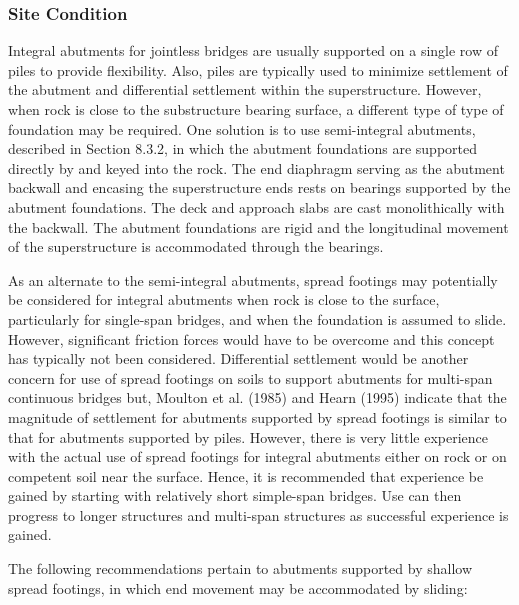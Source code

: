 \subsubsection{Site Condition}
Integral abutments for jointless bridges are usually supported on a single row of piles to provide flexibility. Also,
piles are typically used to minimize settlement of the abutment and differential settlement within the superstructure.
However, when rock is close to the substructure bearing surface, a different type of type of foundation may be
required. One solution is to use semi-integral abutments, described in Section 8.3.2, in which the abutment
foundations are supported directly by and keyed into the rock. The end diaphragm serving as the abutment backwall
and encasing the superstructure ends rests on bearings supported by the abutment foundations. The deck and approach
slabs are cast monolithically with the backwall. The abutment foundations are rigid and the longitudinal movement of
the superstructure is accommodated through the bearings.

As an alternate to the semi-integral abutments, spread footings may potentially be considered for integral
abutments when rock is close to the surface, particularly for single-span bridges, and when the foundation is assumed
to slide. However, significant friction forces would have to be overcome and this concept has typically not been
considered. Differential settlement would be another concern for use of spread footings on soils to support abutments
for multi-span continuous bridges but, Moulton et al. (1985) and Hearn (1995) indicate that the magnitude of
settlement for abutments supported by spread footings is similar to that for abutments supported by piles. However,
there is very little experience with the actual use of spread footings for integral abutments either on rock or on
competent soil near the surface. Hence, it is recommended that experience be gained by starting with relatively short
simple-span bridges. Use can then progress to longer structures and multi-span structures as successful experience is
gained.

The following recommendations pertain to abutments supported by shallow spread footings, in which end
movement may be accommodated by sliding:

